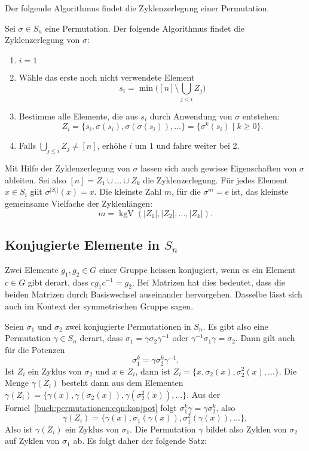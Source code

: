 Der folgende Algorithmus findet die Zyklenzerlegung einer Permutation.

\begin{satz}
Sei $\sigma\in S_n$ eine Permutation. Der folgende Algorithmus findet
die Zyklenzerlegung von $\sigma$:
\begin{enumerate}
\item
$i=1$
\item
Wähle das erste noch nicht verwendete Element
\[
s_i=\min\biggl( [n] \setminus \bigcup_{j< i} Z_j\biggr)
\]
\item
Bestimme alle Elemente, die aus $s_i$ durch Anwendung von $\sigma$
entstehen:
\[
Z_i
=
\{ s_i, \sigma(s_i), \sigma(\sigma(s_i)), \dots \}
=
\{\sigma^k(s_i)\;|\; k\ge 0\}.
\]
\item
Falls $\bigcup_{j\le i} Z_j\ne [n]$, erhöhe $i$ um $1$ und fahre 
weiter bei 2.
\end{enumerate}
\end{satz}

Mit Hilfe der Zyklenzerlegung von $\sigma$ lassen sich auch
gewisse Eigenschaften von $\sigma$ ableiten.
Sei also $[n] = Z_1\cup\dots\cup Z_k$ die Zyklenzerlegung.
Für jedes Element $x\in S_i$ gilt $\sigma^{|S_i|}(x) = x$.
Die kleinste Zahl $m$, für die $\sigma^m=e$ ist, das kleinste
gemeinsame Vielfache der Zyklenlängen:
\[
m = \operatorname{kgV} (|Z_1|,|Z_2|,\dots,|Z_k|).
\]

\subsection{Konjugierte Elemente in $S_n$}
Zwei Elemente $g_1,g_2\in G$ einer Gruppe heissen konjugiert, wenn
es ein Element $c\in G$ gibt derart, dass $cg_1c^{-1}=g_2$.
Bei Matrizen hat dies bedeutet, dass die beiden Matrizen durch
Basiswechsel auseinander hervorgehen.
Dasselbe lässt sich auch im Kontext der symmetrischen Gruppe sagen.

Seien $\sigma_1$ und $\sigma_2$ zwei konjugierte Permutationen in $S_n$.
Es gibt also eine Permutation $\gamma\in S_n$ derart, dass
$\sigma_1=\gamma\sigma_2\gamma^{-1}$ oder $\gamma^{-1}\sigma_1\gamma=\sigma_2$.
Dann gilt auch für die Potenzen
\begin{equation}
\sigma_1^k = \gamma\sigma_2^k\gamma^{-1}.
\label{buch:permutationen:eqn:konjpot}
\end{equation}
Ist $Z_i$ ein Zyklus von $\sigma_2$ und $x\in Z_i$, dann ist
$Z_i = \{ x,\sigma_2(x),\sigma_2^2(x),\dots\}$.
Die Menge $\gamma(Z_i)$ besteht dann aus dem Elementen
$\gamma(Z_i)=\{\gamma(x),\gamma(\sigma_2(x)),\gamma(\sigma_2^2(x)),\dots\}$.
Aus der Formel~\eqref{buch:permutationen:eqn:konjpot} folgt
$\sigma_1^k\gamma = \gamma\sigma_2^k$, also
\[
\gamma(Z_i)
=
\{\gamma(x),\sigma_1(\gamma(x)),\sigma_1^2(\gamma(x)),\dots\},
\]
Also ist $\gamma(Z_i)$ ein Zyklus von $\sigma_1$.
Die Permutation $\gamma$ bildet also Zyklen von $\sigma_2$ auf Zyklen
von $\sigma_1$ ab.
Es folgt daher der folgende Satz:

